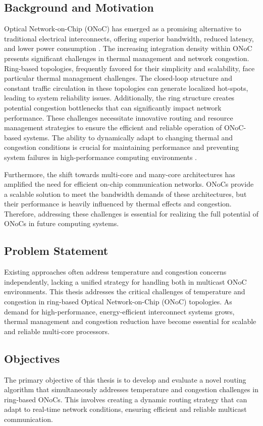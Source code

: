 \documentclass[12pt]{article}
\begin{document}
\subsection{Background and Motivation}
Optical Network-on-Chip (ONoC) has emerged as a promising alternative to traditional electrical interconnects, offering superior bandwidth, reduced latency, and lower power consumption \cite{bjerregaard2006network}. The increasing integration density within ONoC presents significant challenges in thermal management and network congestion. Ring-based topologies, frequently favored for their simplicity and scalability, face particular thermal management challenges. The closed-loop structure and constant traffic circulation in these topologies can generate localized hot-spots, leading to system reliability issues. Additionally, the ring structure creates potential congestion bottlenecks that can significantly impact network performance. These challenges necessitate innovative routing and resource management strategies to ensure the efficient and reliable operation of ONoC-based systems. The ability to dynamically adapt to changing thermal and congestion conditions is crucial for maintaining performance and preventing system failures in high-performance computing environments \cite{li2018congestion}.

Furthermore, the shift towards multi-core and many-core architectures has amplified the need for efficient on-chip communication networks. ONoCs provide a scalable solution to meet the bandwidth demands of these architectures, but their performance is heavily influenced by thermal effects and congestion. Therefore, addressing these challenges is essential for realizing the full potential of ONoCs in future computing systems.

\subsection{Problem Statement}
Existing approaches often address temperature and congestion concerns independently, lacking a unified strategy for handling both in multicast ONoC environments. This thesis addresses the critical challenges of temperature and congestion in ring-based Optical Network-on-Chip (ONoC) topologies. As demand for high-performance, energy-efficient interconnect systems grows, thermal management and congestion reduction have become essential for scalable and reliable multi-core processors.

\subsection{Objectives}
The primary objective of this thesis is to develop and evaluate a novel routing algorithm that simultaneously addresses temperature and congestion challenges in ring-based ONoCs. This involves creating a dynamic routing strategy that can adapt to real-time network conditions, ensuring efficient and reliable multicast communication.
\end{document}
